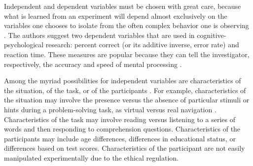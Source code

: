 Independent and dependent variables must be chosen with great care, because what is learned from an experiment will depend almost exclusively on the variables one chooses to isolate from the often complex behavior one is observing \cite{Sternberg2011}. The authors suggest two dependent variables that are used in cognitive-psychological research: percent correct (or its additive inverse, error rate) and reaction time. These measures are popular because they can tell the investigator, respectively, the accuracy and speed of mental processing \cite{Sternberg2011}. 

Among the myriad possibilities for independent variables are characteristics of the situation, of the task, or of the participants \cite{Sternberg2011}. For example, characteristics of the situation may involve the presence versus the absence of particular stimuli or hints during a problem-solving task, as virtual versus real navigation \cite{Lahav2008b}. Characteristics of the task may involve reading versus listening to a series of words and then responding to comprehension questions. Characteristics of the participants may include age differences, differences in educational status, or differences based on test scores. Characteristics of the participant are not easily manipulated experimentally due to the ethical regulation.
